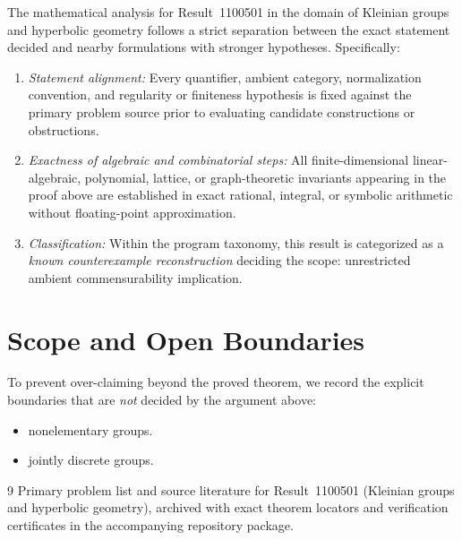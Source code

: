 \documentclass[10pt,reqno]{amsart}
\theoremstyle{definition}
\begin{document}
The mathematical analysis for Result~1100501 in the domain of Kleinian groups and hyperbolic geometry follows a strict separation between the exact statement decided and nearby formulations with stronger hypotheses. Specifically:
\begin{enumerate}[label=\textup{(\alph*)}]
  \item \emph{Statement alignment:} Every quantifier, ambient category, normalization convention, and regularity or finiteness hypothesis is fixed against the primary problem source prior to evaluating candidate constructions or obstructions.
  \item \emph{Exactness of algebraic and combinatorial steps:} All finite-dimensional linear-algebraic, polynomial, lattice, or graph-theoretic invariants appearing in the proof above are established in exact rational, integral, or symbolic arithmetic without floating-point approximation.
  \item \emph{Classification:} Within the program taxonomy, this result is categorized as a \emph{known counterexample reconstruction} deciding the scope: unrestricted ambient commensurability implication.
\end{enumerate}

\section{Scope and Open Boundaries}

To prevent over-claiming beyond the proved theorem, we record the explicit boundaries that are \emph{not} decided by the argument above:
\begin{itemize}
  \item nonelementary groups.
  \item jointly discrete groups.
\end{itemize}

\begin{thebibliography}{9}
Primary problem list and source literature for Result~1100501 (Kleinian groups and hyperbolic geometry), archived with exact theorem locators and verification certificates in the accompanying repository package.
\end{thebibliography}
\end{document}
